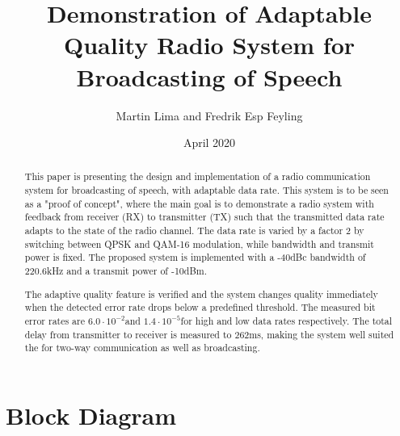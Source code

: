 \documentclass[9pt,journal]{IEEEtran}
\title{Demonstration of Adaptable Quality Radio System for Broadcasting of Speech}
\author{Martin Lima and Fredrik Esp Feyling }
\date{April 2020}
\newcommand{\measBW}{220.6} %
\newcommand{\measPWR}{-10} %
\newcommand{\measDelay}{262} %
\newcommand{\measBERQAMGood}{$6.0\cdot10^{-2}$}
\newcommand{\measBERQPSKBad}{$1.4\cdot10^{-5}$}
\begin{document}
\maketitle
\begin{abstract} 
This paper is presenting the design and implementation of a radio communication system for broadcasting of speech, with adaptable data rate. This system is to be seen as a "proof of concept", where the main goal is to demonstrate a radio system with feedback from receiver (RX) to transmitter (TX) such that the transmitted data rate adapts to the state of the radio channel. The data rate is varied by a factor 2 by switching between QPSK and QAM-16 modulation, while bandwidth and transmit power is fixed. The proposed system is implemented with a -40dBc bandwidth of \measBW kHz and a transmit power of \measPWR dBm.

The adaptive quality feature is verified and the system changes quality immediately when the detected error rate drops below a predefined threshold. The measured bit error rates are \measBERQAMGood  and \measBERQPSKBad for high and low data rates respectively. The total delay from transmitter to receiver is measured to \measDelay ms, making the system well suited the for two-way communication as well as broadcasting. 
\end{abstract}


















\appendices

\section{Block Diagram}
\label{a:block_diagram}


\end{document}
